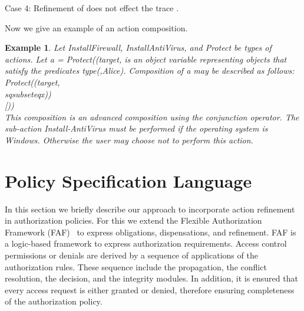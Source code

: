 \documentclass[12pt,journal,letterpaper,onecolumn]{IEEEtran}
\newtheorem{example}{Example}[section]
\begin{document}
\noindent Case 4: Refinement of  does not effect the trace
. \hfill







Now we give an example of an action composition.
\begin{example}  Let  {\ttfamily InstallFirewall},   {\ttfamily InstallAntiVirus}, and
 {\ttfamily Protect} be types of actions. Let  {\ttfamily a = Protect((target,\x} is an object variable representing objects that satisfy the
predicates  {\ttfamily type(\x,Alice)}. Composition of  {\ttfamily a}
may be described as follows: \\
 {\ttfamily Protect((target,\\sqsubseteqx))}  \\
\indent \indent \indent \indent \indent \indent \indent
 {\ttfamily [\x))}\\
This composition is an advanced composition using the conjunction
operator. The sub-action  {\ttfamily Install}-{\ttfamily AntiVirus} must be
performed if the operating system is Windows. Otherwise the user may
choose not to perform this action. \label{eg:actionrefinement}
\end{example}


\section{Policy Specification Language}
\label{sec:language} In this section we briefly describe our
approach to incorporate action refinement in authorization policies.
For this we extend the Flexible Authorization Framework
(FAF)~\cite{Jajodia01} to express obligations,
dispensations, and refinement.
FAF is a logic-based framework to express authorization requirements.
Access control permissions or denials are derived by a sequence of applications
of the authorization rules.  These sequence include the propagation, the conflict
resolution, the decision, and the integrity modules.  In addition, it is ensured
that every access request is either granted or denied, therefore ensuring completeness
of the authorization policy.
\end{document}
